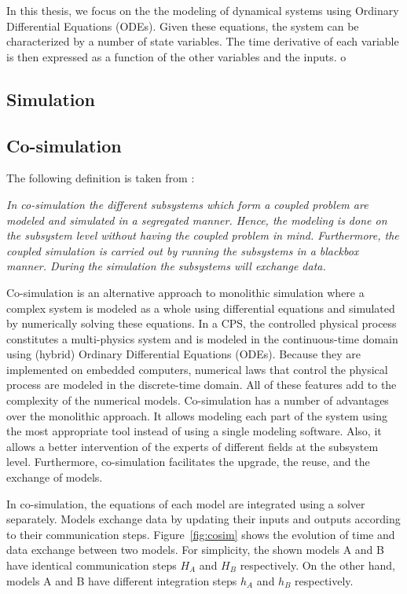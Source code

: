 In this thesis, we focus on the the modeling of dynamical systems using Ordinary Differential Equations (ODEs). Given these equations, the system can be characterized by a number of state variables. The time derivative of each variable is then expressed as a function of the other variables and the inputs. %
o
\subsection{Simulation}

\subsection{Co-simulation}

The following definition is taken from \cite{sicklinger:2014}:

\textit{
In co-simulation the different subsystems which form a coupled problem are modeled and simulated in a segregated manner. Hence, the modeling is done on the subsystem level without having the coupled problem in mind. Furthermore, the coupled simulation is carried out by running the subsystems in a blackbox manner. During the simulation the subsystems will exchange data.}


Co-simulation is an alternative approach to monolithic simulation where a complex system is modeled as a whole using differential equations and simulated by numerically solving these equations. In a CPS, the controlled physical process constitutes a multi-physics system and is modeled in the continuous-time domain using (hybrid) Ordinary Differential Equations (ODEs). Because they are implemented on embedded computers, numerical laws that control the physical process are modeled in the discrete-time domain. All of these features add to the complexity of the numerical models. Co-simulation has a number of advantages over the monolithic approach. It allows modeling each part of the system using the most appropriate tool instead of using a single modeling software. Also, it allows a better intervention of the experts of different fields at the subsystem level. Furthermore, co-simulation facilitates the upgrade, the reuse, and the exchange of models. 

In co-simulation, the equations of each model are integrated using a solver separately. Models exchange data by updating their inputs and outputs according to their communication steps. Figure~\ref{fig:cosim} shows the evolution of time and data exchange between two models. For simplicity, the shown models A and B have identical communication steps $H_A$ and $H_B$ respectively. On the other hand, models A and B have different integration steps $h_A$ and $h_B$ respectively.

